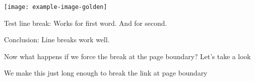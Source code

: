 \documentclass[a5paper,twocolumn]{scrartcl}
\begin{document}
  \begin{figure*}[t]
    \texttt{[image: example-image-golden]}
  \end{figure*}
  \lipsum[1]
  \lipsum[1]
  \lipsum[2]
  Test line break:
  \citep{strunk-and-white}
  Works for first word.
  \citep{strunk-and-white}
  And for second.

  Conclusion: Line breaks work well.

  Now what happens if we force the break at the page boundary?
  Let's take a look

  We make this just long enough to break the link at page boundary
  \color{red}{(Strunk and White, 1979)}
  
\end{document}
